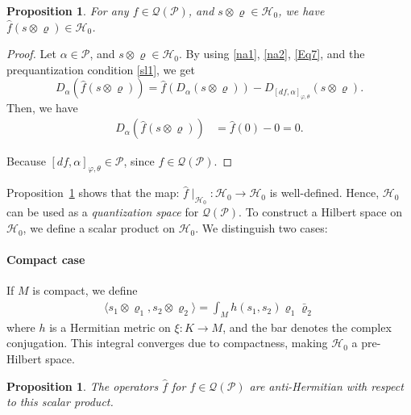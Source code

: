 \documentclass[a4paper,10pt]{article}
\numberwithin{equation}{section}
\theoremstyle{plain}
\newtheorem{proposition}[theorem]{Proposition}
\begin{document}
	\begin{proposition}\label{GQprop1}
		For any $f \in \mathcal{Q}(\mathcal{P})$, and $s \otimes \varrho \in \mathcal{H}_0$, we have $\hat{f}(s \otimes \varrho) \in \mathcal{H}_0$.
	\end{proposition}
	
	\begin{proof}
		Let  $\alpha \in \mathcal{P}$, and $s \otimes \varrho \in \mathcal{H}_0$. By using \eqref{na1}, \eqref{na2}, \eqref{Eq7}, and the prequantization condition \eqref{sl1}, we get
		\[
		D_\alpha(\hat{f}(s \otimes \varrho)) = \hat{f}(D_\alpha(s \otimes \varrho))-D_{[df,\alpha]_{\varphi,\theta}}(s \otimes \varrho).
		\]
		Then, we have
		\begin{align*}
		D_\alpha(\hat{f}(s \otimes \varrho))&=\hat{f}(0)-0=0.
		\end{align*}
		
		Because $[df,\alpha]_{\varphi,\theta} \in \mathcal{P}$,  since  $f \in \mathcal{Q}(\mathcal{P})$.
	\end{proof}
	Proposition~\ref{GQprop1} shows that the map: $\hat{f}\mid_{\mathcal{H}_0}: \mathcal{H}_0\longrightarrow \mathcal{H}_0$ is well-defined.
	Hence, $\mathcal{H}_0$ can be used as a \emph{quantization space} for $\mathcal{Q}(\mathcal{P})$.
	To construct a Hilbert space on $\mathcal{H}_0$, we define a scalar product on $\mathcal{H}_0$.  We distinguish two cases:
	
	\paragraph{Compact case} If $M$ is compact, we  define
	\begin{align}\label{nb1}
	\langle s_1 \otimes \varrho_1, s_2 \otimes \varrho_2 \rangle = \int_M h(s_1,s_2) \varrho_1 \bar{\varrho}_2
	\end{align}
	where $h$ is  a Hermitian metric on  $\xi: K\longrightarrow M$, and the bar denotes  the complex conjugation.
	This integral converges due to compactness, making $\mathcal{H}_0$   a pre-Hilbert space.
	\begin{proposition}
		The operators $\hat{f}$ for $f \in \mathcal{Q}(\mathcal{P})$ are anti-Hermitian with respect to this scalar product.
	\end{proposition}
	
\end{document}
